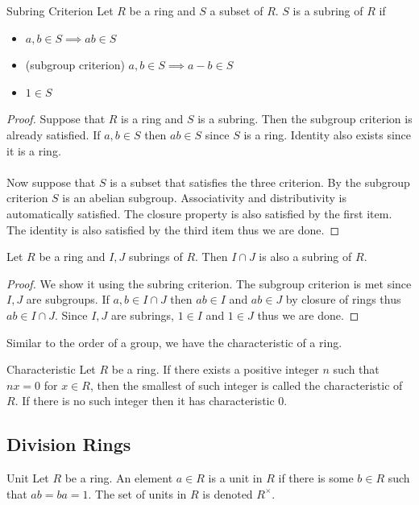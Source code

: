 \documentclass[a4paper]{article}
\begin{document}
\begin{thm}{Subring Criterion}{} Let $R$ be a ring and $S$ a subset of $R$. $S$ is a subring of $R$ if
\begin{itemize}
\item $a,b\in S\implies ab\in S$
\item (subgroup criterion) $a,b\in S\implies a-b\in S$
\item $1\in S$
\end{itemize}\tcbline
\begin{proof}
Suppose that $R$ is a ring and $S$ is a subring. Then the subgroup criterion is already satisfied. If $a,b\in S$ then $ab\in S$ since $S$ is a ring. Identity also exists since it is a ring. \\~\\
Now suppose that $S$ is a subset that satisfies the three criterion. By the subgroup criterion $S$ is an abelian subgroup. Associativity and distributivity is automatically satisfied. The closure property is also satisfied by the first item. The identity is also satisfied by the third item thus we are done. 
\end{proof}
\end{thm}

\begin{prp}{}{} Let $R$ be a ring and $I,J$ subrings of $R$. Then $I\cap J$ is also a subring of $R$. \tcbline
\begin{proof}
We show it using the subring criterion. The subgroup criterion is met since $I,J$ are subgroups. If $a,b\in I\cap J$ then $ab\in I$ and $ab\in J$ by closure of rings thus $ab\in I\cap J$. Since $I,J$ are subrings, $1\in I$ and $1\in J$ thus we are done. 
\end{proof}
\end{prp}

Similar to the order of a group, we have the characteristic of a ring. 

\begin{defn}{Characteristic}{} Let $R$ be a ring. If there exists a positive integer $n$ such that $nx=0$ for $x\in R$, then the smallest of such integer is called the characteristic of $R$. If there is no such integer then it has characteristic $0$. 
\end{defn}

\subsection{Division Rings}
\begin{defn}{Unit}{} Let $R$ be a ring. An element $a\in R$ is a unit in $R$ if there is some $b\in R$ such that $ab=ba=1$. The set of units in $R$ is denoted $R^\times$. 
\end{defn}
\end{document}
